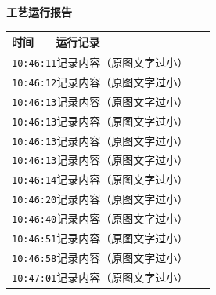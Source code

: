 \documentclass[UTF8,10pt,a4paper,fontset=fandol]{ctexart}
\newcommand{\fieldvalue}[1]{#1}
\begin{document}
\begin{minipage}[t]{0.48\linewidth}
\centering
\textbf{工艺运行报告}

\small
\begin{tabular}{|p{0.20\linewidth}|p{0.72\linewidth}|}
\hline
时间 & 运行记录\\ \hline
\multicolumn{2}{|l|}{
\fieldvalue{\texttt{10:46:11}\quad 记录内容（原图文字过小）}} \\ \hline
\multicolumn{2}{|l|}{
\fieldvalue{\texttt{10:46:12}\quad 记录内容（原图文字过小）}} \\ \hline
\multicolumn{2}{|l|}{
\fieldvalue{\texttt{10:46:13}\quad 记录内容（原图文字过小）}} \\ \hline
\multicolumn{2}{|l|}{
\fieldvalue{\texttt{10:46:13}\quad 记录内容（原图文字过小）}} \\ \hline
\multicolumn{2}{|l|}{
\fieldvalue{\texttt{10:46:13}\quad 记录内容（原图文字过小）}} \\ \hline
\multicolumn{2}{|l|}{
\fieldvalue{\texttt{10:46:13}\quad 记录内容（原图文字过小）}} \\ \hline
\multicolumn{2}{|l|}{
\fieldvalue{\texttt{10:46:14}\quad 记录内容（原图文字过小）}} \\ \hline
\multicolumn{2}{|l|}{
\fieldvalue{\texttt{10:46:20}\quad 记录内容（原图文字过小）}} \\ \hline
\multicolumn{2}{|l|}{
\fieldvalue{\texttt{10:46:40}\quad 记录内容（原图文字过小）}} \\ \hline
\multicolumn{2}{|l|}{
\fieldvalue{\texttt{10:46:51}\quad 记录内容（原图文字过小）}} \\ \hline
\multicolumn{2}{|l|}{
\fieldvalue{\texttt{10:46:58}\quad 记录内容（原图文字过小）}} \\ \hline
\multicolumn{2}{|l|}{
\fieldvalue{\texttt{10:47:01}\quad 记录内容（原图文字过小）}} \\ \hline

\end{tabular}
\end{minipage}
\end{document}
